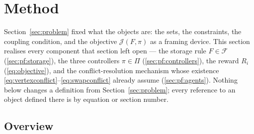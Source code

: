\documentclass[../main.tex]{subfiles}
\begin{document}
%

\section{Method}
\label{sec:method}

Section~\ref{sec:problem} fixed what the objects are: the sets, the
constraints, the coupling condition, and the objective
$\mathcal{J}(F,\pi)$ as a framing device. This section realises every
component that section left open --- the storage rule $F \in \mathcal{F}$
(\ref{sec:pf:storage}), the three controllers $\pi \in \Pi$
(\ref{sec:pf:controllers}), the reward $R_i$
(\eqref{eq:objective}), and the conflict-resolution mechanism whose
existence \eqref{eq:vertexconflict}--\eqref{eq:swapconflict} already assume
(\ref{sec:pf:agents}). Nothing below changes a definition from
Section~\ref{sec:problem}; every reference to an object defined there is by
equation or section number.

\subsection{Overview}
\label{sec:method:overview}
\end{document}
